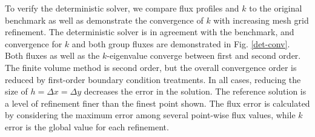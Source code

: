 \documentclass[11pt]{article}
\begin{document}
To verify the deterministic solver, we compare flux profiles and $k$ to the original benchmark\cite{benchmark} as well as demonstrate the convergence of $k$ with increasing mesh grid refinement.  The deterministic solver is in agreement with the benchmark, and convergence for $k$ and both group fluxes are demonstrated in Fig. \ref{det-conv}.  Both fluxes as well as the $k$-eigenvalue converge between first and second order.  The finite volume method is second order, but the overall convergence order is reduced by first-order boundary condition treatments.  In all cases, reducing the size of $h=\Delta x=\Delta y$ decreases the error in the solution.  The reference solution is a level of refinement finer than the finest point shown.   The flux error is calculated by considering the maximum error among several point-wise flux values, while $k$ error is the global value for each refinement.
\end{document}
